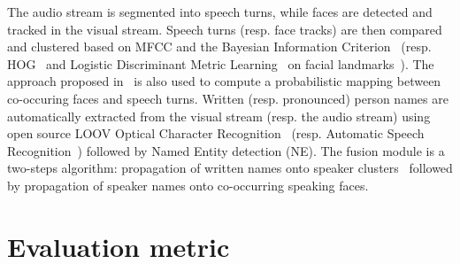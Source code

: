 \documentclass{acm_proc_article-me}
\begin{document}
The audio stream is segmented into speech turns, while faces are detected and tracked in the visual stream.
Speech turns (resp. face tracks) are then compared and clustered based on MFCC and the Bayesian Information Criterion~\cite{CHEN--DARPA--1998} (resp. HOG~\cite{DALAL--CVPR--2005} and Logistic Discriminant Metric Learning~\cite{GUILLAUMIN--JCV--2012} on facial landmarks~\cite{URICAR--VISAPP--2012}). The approach proposed in~\cite{POIGNANT--MTAP--2015} is also used to compute a probabilistic mapping between co-occuring faces and speech turns. Written (resp. pronounced) person names are automatically extracted from the visual stream (resp. the audio stream) using open source LOOV Optical Character Recognition~\cite{POIGNANT--ICME--2012} (resp. Automatic Speech Recognition~\cite{LAMEL--IWSLT--2011, DIANRELLI--IJCNLP--2011}) followed by Named Entity detection (NE). The fusion module is a two-steps algorithm: propagation of written names onto speaker clusters~\cite{POIGNANT--INTERSPEECH--2012} followed by propagation of speaker names onto co-occurring speaking faces.

\section{Evaluation metric}
\label{sec:metric}
\end{document}
